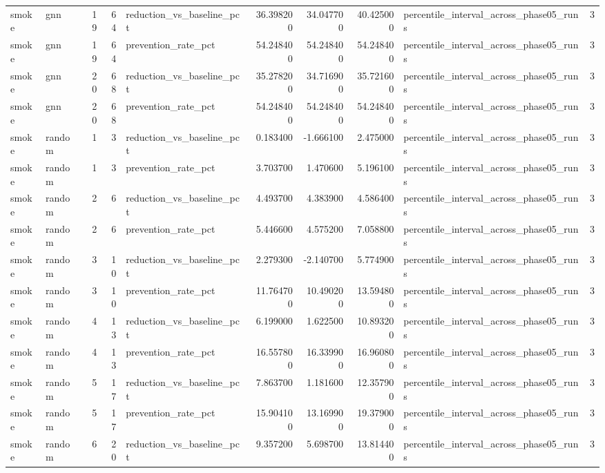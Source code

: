\begin{tabular}{llrrlrrrlr}
smoke & gnn & 19 & 64 & reduction\_vs\_baseline\_pct & 36.398200 & 34.047700 & 40.425000 & percentile\_interval\_across\_phase05\_runs & 3 \\
smoke & gnn & 19 & 64 & prevention\_rate\_pct & 54.248400 & 54.248400 & 54.248400 & percentile\_interval\_across\_phase05\_runs & 3 \\
smoke & gnn & 20 & 68 & reduction\_vs\_baseline\_pct & 35.278200 & 34.716900 & 35.721600 & percentile\_interval\_across\_phase05\_runs & 3 \\
smoke & gnn & 20 & 68 & prevention\_rate\_pct & 54.248400 & 54.248400 & 54.248400 & percentile\_interval\_across\_phase05\_runs & 3 \\
smoke & random & 1 & 3 & reduction\_vs\_baseline\_pct & 0.183400 & -1.666100 & 2.475000 & percentile\_interval\_across\_phase05\_runs & 3 \\
smoke & random & 1 & 3 & prevention\_rate\_pct & 3.703700 & 1.470600 & 5.196100 & percentile\_interval\_across\_phase05\_runs & 3 \\
smoke & random & 2 & 6 & reduction\_vs\_baseline\_pct & 4.493700 & 4.383900 & 4.586400 & percentile\_interval\_across\_phase05\_runs & 3 \\
smoke & random & 2 & 6 & prevention\_rate\_pct & 5.446600 & 4.575200 & 7.058800 & percentile\_interval\_across\_phase05\_runs & 3 \\
smoke & random & 3 & 10 & reduction\_vs\_baseline\_pct & 2.279300 & -2.140700 & 5.774900 & percentile\_interval\_across\_phase05\_runs & 3 \\
smoke & random & 3 & 10 & prevention\_rate\_pct & 11.764700 & 10.490200 & 13.594800 & percentile\_interval\_across\_phase05\_runs & 3 \\
smoke & random & 4 & 13 & reduction\_vs\_baseline\_pct & 6.199000 & 1.622500 & 10.893200 & percentile\_interval\_across\_phase05\_runs & 3 \\
smoke & random & 4 & 13 & prevention\_rate\_pct & 16.557800 & 16.339900 & 16.960800 & percentile\_interval\_across\_phase05\_runs & 3 \\
smoke & random & 5 & 17 & reduction\_vs\_baseline\_pct & 7.863700 & 1.181600 & 12.357900 & percentile\_interval\_across\_phase05\_runs & 3 \\
smoke & random & 5 & 17 & prevention\_rate\_pct & 15.904100 & 13.169900 & 19.379000 & percentile\_interval\_across\_phase05\_runs & 3 \\
smoke & random & 6 & 20 & reduction\_vs\_baseline\_pct & 9.357200 & 5.698700 & 13.814400 & percentile\_interval\_across\_phase05\_runs & 3 \\

\end{tabular}
